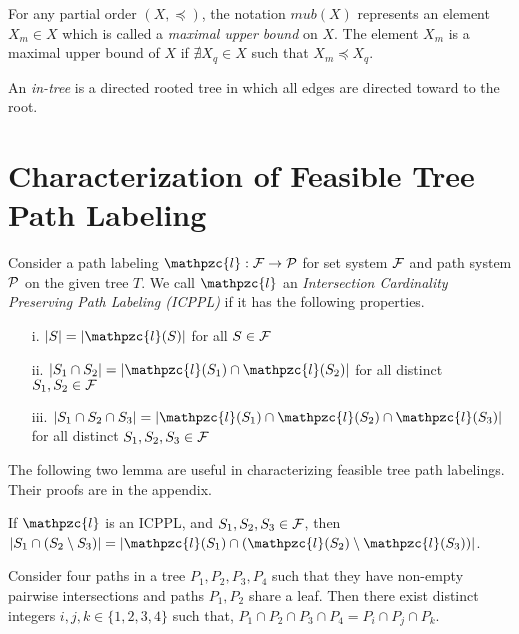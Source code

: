 \documentclass{fsttcs}
\def\cF{{\cal F}}
\def\cP{{\cal P}}
\def\cl{\mathpzc{l}}
\begin{document}
\noindent
For any partial order $(X, \preccurlyeq)$,  the notation $mub(X)$
represents an element $X_m \in X$ which is called
a {\em maximal upper bound} on $X$.  The element $X_m$ is a maximal upper bound of
$X$ if $\nexists X_q \in X$ such that $X_m \preccurlyeq X_q$. 


\noindent
An {\em in-tree} is a directed rooted tree in which all edges are
directed toward to the root.

\section{Characterization of Feasible Tree Path  Labeling} 
\label{sec:feasible} 

Consider a path labeling $\cl: \cF \rightarrow \cP$ for set system $\cF$
and path system $\cP$ on the given tree $T$. We
call $\cl$ an {\em Intersection Cardinality Preserving Path Labeling
  (ICPPL)} if it has the following properties.
\begin{enumerate}
\item [i.]  $|S| = |\cl(S)|$ for all $S \in \cF$
\item [ii.] $|S_1 \cap S_2| = |\cl(S_1) \cap \cl(S_2)|$ for all
  distinct $S_1, S_2 \in \cF$
\item [iii.] $|S_1 \cap S_2 \cap S_3| = |\cl(S_1) \cap \cl(S_2) \cap
  \cl(S_3)|$ for all distinct  $S_1, S_2, S_3 \in \cF$
\end{enumerate}
The following two lemma are useful in characterizing feasible tree path labelings.  Their
proofs are in the appendix.
\begin{lemma}
  \label{lem:setminuscard}
  If $\cl$ is an ICPPL, and $S_1, S_2, S_3 \in \cF$, then $|S_1 \cap
  (S_2 \setminus S_3)| = |\cl(S_1) \cap (\cl(S_2) \setminus
  \cl(S_3))|$.
\end{lemma}
\begin{lemma}\label{lem:fourpaths} 
  Consider four paths in a tree $P_1, P_2, P_3, P_4$ such that they
  have non-empty pairwise intersections and paths $P_1, P_2$ share a
  leaf. Then there exist distinct integers $i, j, k \in \{1,2,3,4\}$ such
  that, $P_1 \cap P_2 \cap P_3 \cap P_4 = P_i \cap P_j \cap P_k$.
\end{lemma}
\end{document}
